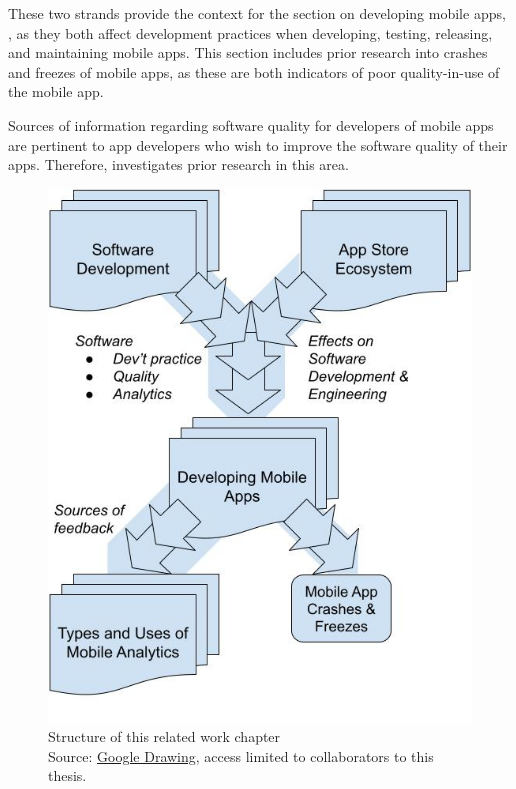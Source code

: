 These two strands provide the context for the section on developing mobile apps, , as they both affect development practices when developing, testing, releasing, and maintaining mobile apps. This section includes prior research into crashes and freezes of mobile apps, as these are both indicators of poor quality-in-use of the mobile app.

Sources of information regarding software quality for developers of mobile apps are pertinent to app developers who wish to improve the software quality of their apps. Therefore,  investigates prior research in this area.


\begin{figure}
    \centering
    \includegraphics[width=\textwidth]{images/my/related-work-chapter-structure-27-jul-2022b.jpeg}
    \caption[Structure of this related work chapter]{Structure of this related work chapter\\ Source: \href{https://docs.google.com/drawings/d/1DosM__BfTGqoIYkkkltbyDreCT5wYC1Z0mR9i1ZSxWc/edit?usp=sharing}{Google Drawing}, access limited to collaborators to this thesis.}
    \label{fig:related-work-chapter-structure}
\end{figure}

